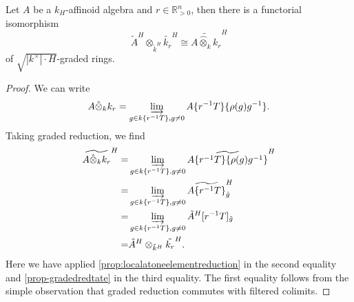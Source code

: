 \begin{corollary}
    Let $A$ be a $k_H$-affinoid algebra and $r\in \mathbb{R}^n_{>0}$, then there is a functorial isomorphism
    \[
        \tilde{A}^H\otimes_{\tilde{k}^H} \tilde{k_r}^H\cong \widetilde{A\hat{\otimes}_k k_r}^H
    \]
    of $\sqrt{|k^{\times}|\cdot H}$-graded rings.
\end{corollary}
\begin{proof}
    We can write
    \[
        A\hat{\otimes}_k k_r=\varinjlim_{g\in k\{r^{-1}T\},g\neq 0} A\{r^{-1}T\}\{\rho(g)g^{-1}\}.
    \]
    Taking graded reduction, we find
    \[
        \begin{aligned}
        \widetilde{A\hat{\otimes}_k k_r}^H=&\varinjlim_{g\in k\{r^{-1}T\},g\neq 0} \widetilde{A\{r^{-1}T\}\{\rho(g)g^{-1}\}}^H\\
        =&\varinjlim_{g\in k\{r^{-1}T\},g\neq 0} \widetilde{A\{r^{-1}T\}}^H_{\tilde{g}}\\
        =&\varinjlim_{g\in k\{r^{-1}T\},g\neq 0} \tilde{A}^H[r^{-1}T]_{\tilde{g}}\\
        =&\tilde{A}^H\otimes_{\tilde{k}^H} \tilde{k_r}^H.
        \end{aligned}
    \]
    Here we have applied \cref{prop:localatoneelementreduction} in the second equality and \cref{prop-gradedredtate} in the third equality. The first equality follows from the simple observation that graded reduction commutes with filtered colimits.
\end{proof}



